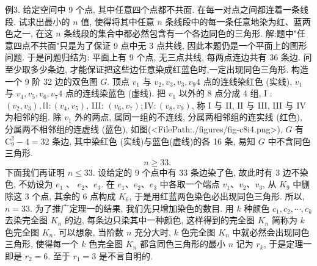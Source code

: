 例3. 给定空间中 9 个点, 其中任意四个点都不共面.
在每一对点之间都连着一条线段.
试求出最小的 $n$ 值, 使得将其中任意 $n$ 条线段中的每一条任意地染为红、蓝两色之一, 在这 $n$ 条线段的集合中都必然包含有一个各边同色的三角形.
解:题中"任意四点不共面"只是为了保证 9 点中无 3 点共线, 因此本题仍是一个平面上的图形问题.
于是问题归结为: 平面上有 9 个点, 无三点共线, 每两点连边共有 36 条边.
问至少取多少条边, 才能保证把这些边任意染成红蓝色时,一定出现同色三角形.
构造一个 9 阶 32 边的双色图 $G$. 顶点 $v_1$ 与 $v_2, v_3, v_3, v_9 4$ 点的连线染红色 (实线), $v_1$ 与 $v_4, v_5, v_6, v_7 4$ 点的连线染蓝色 (虚线). 把 $v_1$ 以外的 8 点分成 4 组, I : $\left(v_2, v_3\right), \mathbb{I I}:\left(v_4, v_5\right)$, III: $\left(v_6, v_7\right) ; \mathrm{IV}:\left(v_8, v_9\right)$, 称 I 与 II, $\mathrm{II}$ 与 III, III 与 IV 为相邻的组.
除 $v_1$ 外的两点, 属同一组的不连线, 分属两相邻组的连实线 (红色), 分属两不相邻组的连虚线 (蓝色), 如图(<FilePath:./figures/fig-c8i4.png>), $G$ 有 $\mathrm{C}_9^2-4=32$ 条边, 其中染红色 (实线)与蓝色(虚线)的各 16 条, 易知 $G$ 中不含同色三角形.
$$
n \geqslant 33 \text {. }
$$
下面我们再证明 $n \leqslant 33$.
设给定的 9 个点中有 33 条边染了色, 故此时有 3 边不染色, 不妨设为 $e_1$ 、 $e_2 、 e_3$. 在 $e_1 、 e_2 、 e_3$ 中各取一个端点 $v_1 、 v_2 、 v_3$, 从 $K_9$ 中删除这 3 个点, 其余的 6 点构成 $K_6$, 于是用红蓝两色染色必出现同色三角形.
所以, $n=33$.
为了推广定理一的结果, 我们先只增加染色的数目.
用 $k$ 种颜色 $c_1, c_2, \cdots, c_k$ 去染完全图 $K_n$ 的边, 每条边只染其中一种颜色, 这样得到的完全图 $K_n$ 简称为 $k$ 色完全图 $K_n$. 可以想象, 当阶数 $n$ 充分大时, $k$ 色完全图 $K_n$ 中就必然会出现同色三角形, 使得每一个 $k$ 色完全图 $K_n$ 都含同色三角形的最小 $n$ 记为 $r_k$, 于是定理一即是 $r_2=6$. 至于 $r_1=3$ 是不言自明的.



